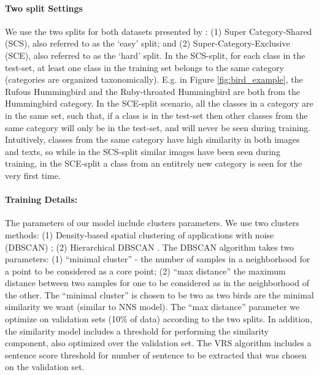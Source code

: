 \documentclass[11pt,a4paper]{article}
\begin{document}
\paragraph{Two split Settings} We use the two splits for both datasets presented by \citet{elhoseiny2017link}: (1) Super Category-Shared (SCS), also referred to as the \enquote*{easy} split; and (2) Super-Category-Exclusive (SCE), also referred to as the \enquote*{hard} split. In the SCS-split, for each class in the test-set, at least one class in the training set belongs to the same category (categories are organized taxonomically). E.g. in Figure \ref{fig:bird_example}, the Rufous Hummingbird and the Ruby-throated Hummingbird are both from the Hummingbird category. In the SCE-split scenario, all the classes in a category are in the same set, such that, if a class is in the test-set then other classes from the same category will only be in the test-set, and will never be seen during training. Intuitively, classes from the same category have high similarity in both images and texts, so while in the SCS-split similar images have been seen during training, in the SCE-split a class from an entitrely new category is seen for the very first time. %

\paragraph{Training Details:}
The parameters of our model include clusters parameters. We use two clusters methods: (1) Density-based spatial clustering of applications with noise (DBSCAN) \citep{ester1996density}; (2) Hierarchical DBSCAN \citep{mcinnes2017hdbscan}. The DBSCAN algorithm takes two parameters: (1) \enquote{minimal cluster} - the number of samples in a neighborhood for a point to be considered as a core point; (2) \enquote{max distance} the maximum distance between two samples for one to be considered as in the neighborhood of the other. 
The \enquote{minimal cluster} is chosen to be two as two birds are the minimal similarity we want (similar to NNS model).
The  \enquote{max distance} parameter we optimize on validation sets (10\% of data) according to the two splits. In addition, the similarity model includes a threshold for performing the similarity component, also optimized over the validation set. 
The VRS algorithm includes a sentence score threshold for number of sentence to be extracted that was chosen on the validation set.
\end{document}
